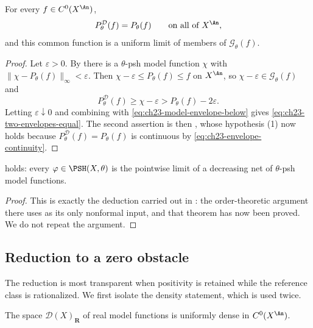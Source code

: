 \begin{corollary}
\label{cor:ch23-envelope-by-model-functions}
For every \(f\in C^0(X^{\An})\),
\begin{equation}\label{eq:ch23-two-envelopes-equal}
 P^{\mathcal D}_\theta(f)=P_\theta(f)
 \qquad\text{on all of }X^{\An},
\end{equation}
and this common function is a uniform limit of members of
\(\mathcal G_\theta(f)\).
\end{corollary}

\begin{proof}
Let \(\varepsilon>0\).  By  there is a
\(\theta\)-psh model function \(\chi\) with
\(\|\chi-P_\theta(f)\|_\infty<\varepsilon\).  Then
\(\chi-\varepsilon\leq P_\theta(f)\leq f\) on \(X^{\An}\), so
\(\chi-\varepsilon\in\mathcal G_\theta(f)\) and
\[
 P^{\mathcal D}_\theta(f)\geq\chi-\varepsilon>P_\theta(f)-2\varepsilon .
\]
Letting \(\varepsilon\downarrow0\) and combining with
\eqref{eq:ch23-model-envelope-below} gives
\eqref{eq:ch23-two-envelopes-equal}.  The second assertion is then
, whose hypothesis (1) now holds because
\(P^{\mathcal D}_\theta(f)=P_\theta(f)\) is continuous by
\eqref{eq:ch23-envelope-continuity}.
\end{proof}

\begin{corollary}
\label{cor:ch23-decreasing-regularization-pointer}
 holds: every
\(\varphi\in\PSH(X,\theta)\) is the pointwise limit of a decreasing net of
\(\theta\)-psh model functions.
\end{corollary}

\begin{proof}
This is exactly the deduction carried out in
: the order-theoretic argument there uses
 as its only nonformal input, and that
theorem has now been proved.  We do not repeat the argument.
\end{proof}

\subsection{Reduction to a zero obstacle}

The reduction is most transparent when positivity is retained while the
reference class is rationalized.  We first isolate the density statement,
which is used twice.

\begin{lemma}
\label{lem:ch23-model-density}
The space \(\mathcal D(X)_{\mathbf R}\) of real model functions is uniformly
dense in \(C^0(X^{\An})\).
\end{lemma}


